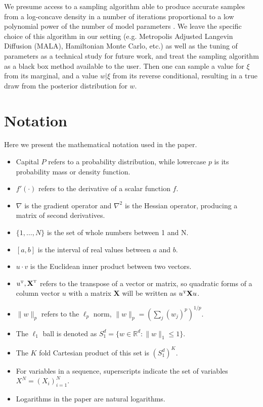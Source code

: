 \documentclass{article}
\numberwithin{equation}{section}
\theoremstyle{Lemma}
\theoremstyle{Corollary}
\theoremstyle{Theorem}
\theoremstyle{Remark}
\begin{document}
We presume access to a sampling algorithm able to produce accurate samples from a log-concave density in a number of iterations proportional to a low polynomial power of the number of model parameters \cite{dwivedi2019log,lovasz2007geometry,livingstone2019geometry,kook2024gaussian,kook2024sampling}. We leave the specific choice of this algorithm in our setting (e.g. Metropolis Adjusted Langevin Diffusion (MALA), Hamiltonian Monte Carlo, etc.) as well as the tuning of parameters as a technical study for future work, and treat the sampling algorithm as a black box method available to the user. Then one can sample a value for $\xi$ from its marginal, and a value $w|\xi$ from its reverse conditional, resulting in a true draw from the posterior distribution for $w$.


\section{Notation}\label{note_section}
Here we present the mathematical notation used in the paper.
\begin{itemize}
    \item Capital $P$ refers to a probability distribution, while lowercase $p$ is its probability mass or density function.
    \item $f'(\cdot)$ refers to the derivative of a scalar function $f$.
    \item $\nabla$ is the gradient operator and $\nabla^{2}$ is the Hessian operator, producing a matrix of second derivatives.
    \item $\{1, \hdots, N\}$ is the set of whole numbers between 1 and N.
    \item $[a,b]$ is the interval of real values between $a$ and $b$.
    \item $u \cdot v$ is the Euclidean inner product between two vectors.
    \item $u^{\text{\tiny{T}}}, \textbf{X}^{\text{\tiny{T}}}$ refers to the transpose of a vector or matrix, so quadratic forms of a column vector $u$ with a matrix $\textbf{X}$ will be written as $u^{\text{\tiny{T}}}\textbf{X}u$.
    \item $\|w\|_{p}$ refers to the $\ell_{p}$ norm, $\|w\|_{p}=(\sum_{j} (				w_{j})^{p})^{1/p}$.
    \item The $\ell_{1}$ ball is denoted as $S^{d}_{1} = \{w \in \mathbb{R}^{d}:\|w\|_{1} \leq 1\}$.
    \item The $K$ fold Cartesian product of this set is $(S^{d}_{1})^{K}$.
    \item For variables in a sequence, superscripts indicate the set of variables $X^{N} = (X_{i})_{i=1}^{N}$.
    \item Logarithms in the paper are natural logarithms.
\end{itemize}
\end{document}
